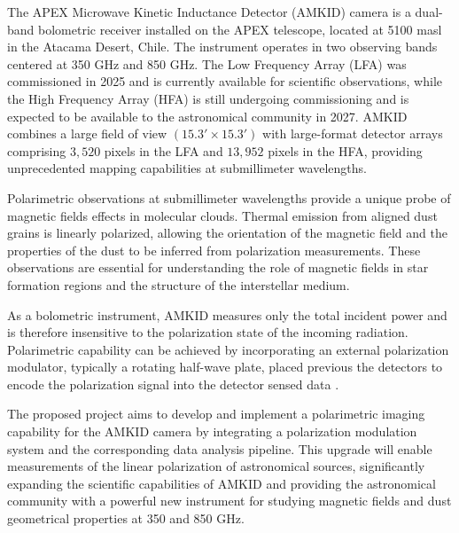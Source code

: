 \documentclass[10pt]{article}
\begin{document}
The APEX Microwave Kinetic Inductance Detector (AMKID) camera is a dual-band bolometric receiver installed on the APEX telescope, located at 5100 masl in the Atacama Desert, Chile. The instrument operates in two observing bands centered at 350 GHz and 850 GHz. The Low Frequency Array (LFA) was commissioned in 2025 and is currently available for scientific observations, while the High Frequency Array (HFA) is still undergoing commissioning and is expected to be available to the astronomical community in 2027. AMKID combines a large field of view $(15.3' \times 15.3')$ with large-format detector arrays comprising $3,520$ pixels in the LFA and $13,952$ pixels in the HFA, providing unprecedented mapping capabilities at submillimeter wavelengths.\cite{reyes2026amkid}

Polarimetric observations at submillimeter wavelengths provide a unique probe of magnetic fields effects in molecular clouds. Thermal emission from aligned dust grains is linearly polarized, allowing the orientation of the magnetic field and the properties of the dust to be inferred from polarization measurements. These observations are essential for understanding the role of magnetic fields in star formation regions and the structure of the interstellar medium.

As a bolometric instrument, AMKID measures only the total incident power and is therefore insensitive to the polarization state of the incoming radiation. Polarimetric capability can be achieved by incorporating an external polarization modulator, typically a rotating half-wave plate, placed previous the detectors to encode the polarization signal into the detector sensed data \cite{giorgio_phd}.

The proposed project aims to develop and implement a polarimetric imaging capability for the AMKID camera by integrating a polarization modulation system and the corresponding data analysis pipeline. This upgrade will enable measurements of the linear polarization of astronomical sources, significantly expanding the scientific capabilities of AMKID and providing the astronomical community with a powerful new instrument for studying magnetic fields and dust geometrical properties at 350 and 850 GHz.







%
%
%
%


\end{document}
